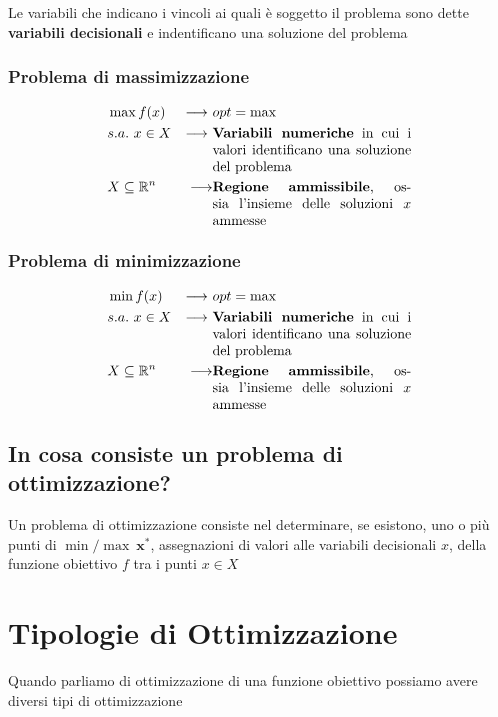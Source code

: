 Le variabili che indicano i vincoli ai quali è soggetto il problema sono dette \textbf{variabili decisionali} e indentificano una soluzione del problema

\begin{minipage}[t]{0.45\textwidth}
    \subsubsection{Problema di massimizzazione}
    $$
    \begin{aligned}
        & \max f(x) & \longrightarrow \ & opt = \max \\
        & s.a. \ x \in X & \longrightarrow \ & \parbox[t]{5cm}{ \textbf{Variabili numeriche} in cui i valori identificano una soluzione del problema} \\
        & X \subseteq \mathbb{R}^n & \longrightarrow & \parbox[t]{5cm}{\textbf{Regione ammissibile}, ossia l'insieme delle soluzioni $x$ ammesse}
    \end{aligned}
    $$
\end{minipage}
\hfill
\begin{minipage}[t]{0.45\textwidth}
    \subsubsection{Problema di minimizzazione}
    $$
    \begin{aligned}
        & \min f(x) & \longrightarrow \ & opt = \max \\
        & s.a. \ x \in X & \longrightarrow \ & \parbox[t]{5cm}{ \textbf{Variabili numeriche} in cui i valori identificano una soluzione del problema} \\
        & X \subseteq \mathbb{R}^n & \longrightarrow & \parbox[t]{5cm}{\textbf{Regione ammissibile}, ossia l'insieme delle soluzioni $x$ ammesse}
    \end{aligned}
    $$
\end{minipage}

\subsection{In cosa consiste un problema di ottimizzazione?}
Un problema di ottimizzazione consiste nel determinare, se esistono, uno o più punti di $\min/\max\ \mathbf{x^*}$, assegnazioni di valori alle variabili decisionali $x$, della funzione obiettivo $f$ tra i punti $x \in X$

\newpage
\section{Tipologie di Ottimizzazione}
Quando parliamo di ottimizzazione di una funzione obiettivo possiamo avere diversi tipi di ottimizzazione

